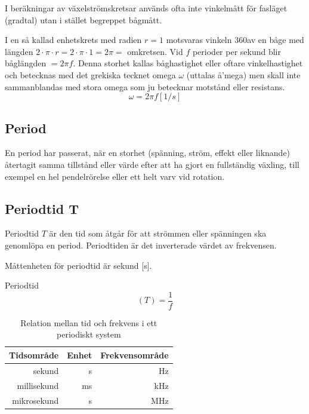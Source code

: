 I beräkningar av växelströmskretsar används ofta inte vinkelmått för fasläget
(gradtal) utan i stället begreppet bågmått.

I en så kallad enhetskrets med radien \(r = 1\) motsvaras vinkeln 360\degree av
en båge med längden \(2 \cdot \pi \cdot r= 2 \cdot \pi \cdot 1 = 2 \pi =\)
omkretsen.
Vid \(f\) perioder per sekund blir båglängden \(= 2\pi f\).
Denna storhet kallas båghastighet eller oftare vinkelhastighet och betecknas
med det grekiska tecknet omega \(\omega\) (uttalas å'mega) men skall
inte sammanblandas med stora omega som ju betecknar motstånd eller resistans.
\[   \omega= 2\pi f \unit{[1/s]}   \]

\subsection{Period}

En period har passerat, när en storhet (spänning, ström, effekt eller
liknande) återtagit samma tillstånd eller värde efter att ha gjort en
fullständig växling, till exempel en hel pendelrörelse eller ett helt
varv vid rotation.

\subsection{Periodtid T}

Periodtid \(T\) är den tid som åtgår för att strömmen eller spänningen
ska genomlöpa en period. Periodtiden är det inverterade värdet av
frekvensen.

Måttenheten för periodtid är sekund [s].

Periodtid
\[   (T) = \dfrac{1}{f}   \]

\begin{table}[h]
  \centering
    \begin{tabular}{rrr}
	         Tidsområde & Enhet     & Frekvensområde \\ \hline
		     sekund & s         & Hz             \\
		millisekund & ms        & kHz            \\
		mikrosekund & \textmu s & MHz
	\end{tabular}
	\caption{Relation mellan tid och frekvens i ett periodiskt system}
\end{table}

